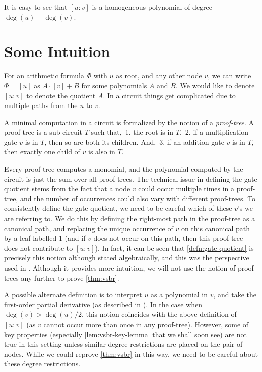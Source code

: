 \noindent
It is easy to see that $[u:v]$ is a homogeneous polynomial of degree
$\deg(u) - \deg(v)$. 

\section*{Some Intuition}

For an arithmetic formula $\Phi$ with $u$ as root, and any other node
$v$, we can write $\Phi = [u]$ as $A \cdot [v] + B$ for some
polynomials $A$ and $B$. 
We would like to denote $[u:v]$ to denote the
quotient $A$. 
In a circuit things get complicated due to multiple
paths from the $u$ to $v$.

A minimal computation in a circuit is formalized by the notion of a \emph{proof-tree}. 
A proof-tree is a sub-circuit $T$ such that,
\,1. the root is in $T$.
\,2. if a multiplication gate $v$ is in $T$, then so are both its children. 
And,
\,3. if an addition gate $v$ is in $T$, then exactly one child of $v$ is also in $T$.

Every proof-tree computes a monomial, and the polynomial computed by
the circuit is just the sum over all proof-trees. 
The technical issue
in defining the gate quotient stems from the fact that a node $v$
could occur multiple times in a proof-tree, and the number of
occurrences could also vary with different proof-trees. 
To
consistently define the gate quotient, we need to be careful which of
these $v$'s we are referring to. 
We do this by defining the right-most
path in the proof-tree as a canonical path, and replacing the unique
occurrence of $v$ on this canonical path by a leaf labelled $1$ (and
if $v$ does not occur on this path, then this proof-tree does not
contribute to $[u:v]$). 
In fact, it can be seen that
\autoref{defn:gate-quotient} is precisely this notion although
stated algebraically, and this was the perspective used in
\cite{ajmv98}. 
Although it provides more intuition, we
will not use the notion of proof-trees any further to prove
\autoref{thm:vsbr}.

A possible alternate definition is to interpret $u$ as a polynomial in
$v$, and take the first-order partial derivative (as described in
\cite{sy}). 
In the case when $\deg(v) > \deg(u)/2$, this notion
coincides with the above definition of $[u:v]$ (as $v$ cannot occur
more than once in any proof-tree). 
However, some of key properties
(especially \autoref{lem:vsbr-key-lemma} that we shall soon see) are
not true in this setting unless similar degree restrictions are placed
on the pair of nodes. 
While we could reprove \autoref{thm:vsbr} in
this way, we need to be careful about these degree restrictions.


